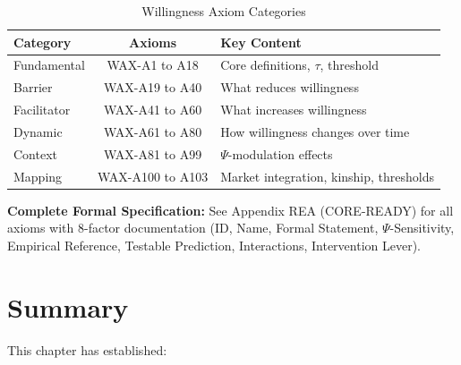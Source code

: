 \begin{table}[h]
\centering
\caption{Willingness Axiom Categories}
\label{tab:axiom-categories}
\begin{tabular}{lcp{6cm}}
\toprule
\textbf{Category} & \textbf{Axioms} & \textbf{Key Content}\\
\midrule
Fundamental & WAX-A1 to A18 & Core definitions, $\tau$, threshold\\
Barrier & WAX-A19 to A40 & What reduces willingness\\
Facilitator & WAX-A41 to A60 & What increases willingness\\
Dynamic & WAX-A61 to A80 & How willingness changes over time\\
Context & WAX-A81 to A99 & $\Psi$-modulation effects\\
Mapping & WAX-A100 to A103 & Market integration, kinship, thresholds\\
\bottomrule
\end{tabular}
\end{table}

\begin{cross-reference}
\textbf{Complete Formal Specification:} See Appendix REA (CORE-READY) for all axioms
with 8-factor documentation (ID, Name, Formal Statement, $\Psi$-Sensitivity,
Empirical Reference, Testable Prediction, Interactions, Intervention Lever).
\end{cross-reference}



\section{Summary}
\label{sec:12-summary}


This chapter has established:

